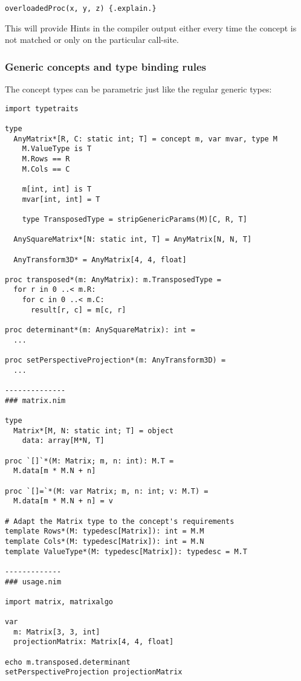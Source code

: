 \begin{verbatim}
overloadedProc(x, y, z) {.explain.}
\end{verbatim}

This will provide Hints in the compiler output either every time the
concept is not matched or only on the particular call-site.

\hypertarget{generic-concepts-and-type-binding-rules}{%
\subsubsection{Generic concepts and type binding
rules}\label{generic-concepts-and-type-binding-rules}}

The concept types can be parametric just like the regular generic types:

\begin{verbatim}
import typetraits

type
  AnyMatrix*[R, C: static int; T] = concept m, var mvar, type M
    M.ValueType is T
    M.Rows == R
    M.Cols == C

    m[int, int] is T
    mvar[int, int] = T

    type TransposedType = stripGenericParams(M)[C, R, T]

  AnySquareMatrix*[N: static int, T] = AnyMatrix[N, N, T]

  AnyTransform3D* = AnyMatrix[4, 4, float]

proc transposed*(m: AnyMatrix): m.TransposedType =
  for r in 0 ..< m.R:
    for c in 0 ..< m.C:
      result[r, c] = m[c, r]

proc determinant*(m: AnySquareMatrix): int =
  ...

proc setPerspectiveProjection*(m: AnyTransform3D) =
  ...

--------------
### matrix.nim

type
  Matrix*[M, N: static int; T] = object
    data: array[M*N, T]

proc `[]`*(M: Matrix; m, n: int): M.T =
  M.data[m * M.N + n]

proc `[]=`*(M: var Matrix; m, n: int; v: M.T) =
  M.data[m * M.N + n] = v

# Adapt the Matrix type to the concept's requirements
template Rows*(M: typedesc[Matrix]): int = M.M
template Cols*(M: typedesc[Matrix]): int = M.N
template ValueType*(M: typedesc[Matrix]): typedesc = M.T

-------------
### usage.nim

import matrix, matrixalgo

var
  m: Matrix[3, 3, int]
  projectionMatrix: Matrix[4, 4, float]

echo m.transposed.determinant
setPerspectiveProjection projectionMatrix
\end{verbatim}

